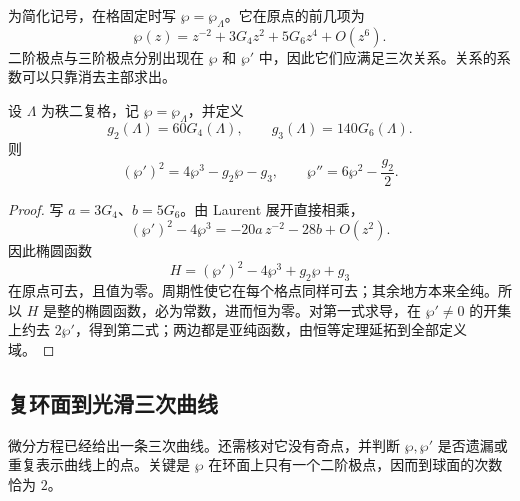 为简化记号，在格固定时写 \(\wp=\wp_\Lambda\)。它在原点的前几项为
\[
	\wp(z)=z^{-2}+3G_4z^2+5G_6z^4+O(z^6).
\]
二阶极点与三阶极点分别出现在 \(\wp\) 和 \(\wp'\) 中，因此它们应满足三次关系。关系的系数可以只靠消去主部求出。

\begin{proposition}\label{g4:prop:0405:differential-equation}
	设 \(\Lambda\) 为秩二复格，记 \(\wp=\wp_\Lambda\)，并定义
	\begin{equation}\label{g4:eq:0405:invariants}
		g_2(\Lambda)=60G_4(\Lambda),\qquad
		g_3(\Lambda)=140G_6(\Lambda).
	\end{equation}
	则
	\begin{equation}\label{g4:eq:0405:wp-equation}
		(\wp')^2=4\wp^3-g_2\wp-g_3,
		\qquad
		\wp''=6\wp^2-\frac{g_2}{2}.
	\end{equation}
\end{proposition}
\begin{proof}
	写 \(a=3G_4\)、\(b=5G_6\)。由 Laurent 展开直接相乘，
	\[
		(\wp')^2-4\wp^3=-20a\,z^{-2}-28b+O(z^2).
	\]
	因此椭圆函数
	\[
		H=(\wp')^2-4\wp^3+g_2\wp+g_3
	\]
	在原点可去，且值为零。周期性使它在每个格点同样可去；其余地方本来全纯。所以 \(H\) 是整的椭圆函数，必为常数，进而恒为零。对第一式求导，在 \(\wp'\ne0\) 的开集上约去 \(2\wp'\)，得到第二式；两边都是亚纯函数，由恒等定理延拓到全部定义域。
\end{proof}

\subsection{复环面到光滑三次曲线}
\label{g4:subsec:0405:02}

微分方程已经给出一条三次曲线。还需核对它没有奇点，并判断 \(\wp,\wp'\) 是否遗漏或重复表示曲线上的点。关键是 \(\wp\) 在环面上只有一个二阶极点，因而到球面的次数恰为 \(2\)。

